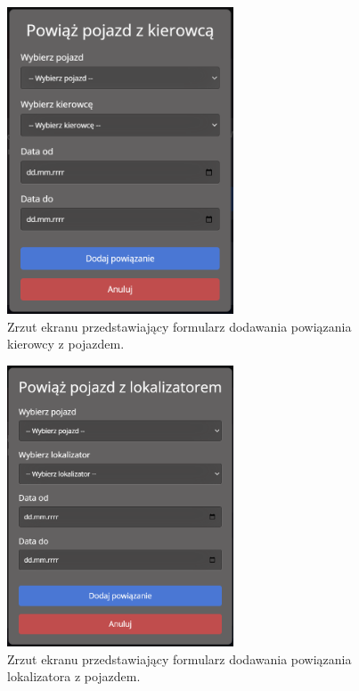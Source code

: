 \begin{figure}
	\centering
	\includegraphics[width=0.6\textwidth]{./graf/add_driver_vehicle.png}
	\caption{Zrzut ekranu przedstawiający formularz dodawania powiązania kierowcy z pojazdem.}
	\label{fig:4.12}
\end{figure}

\begin{figure}
	\centering
	\includegraphics[width=0.6\textwidth]{./graf/add_tracker_vehicle.png}
	\caption{Zrzut ekranu przedstawiający formularz dodawania powiązania lokalizatora z pojazdem.}
	\label{fig:4.13}
\end{figure}

